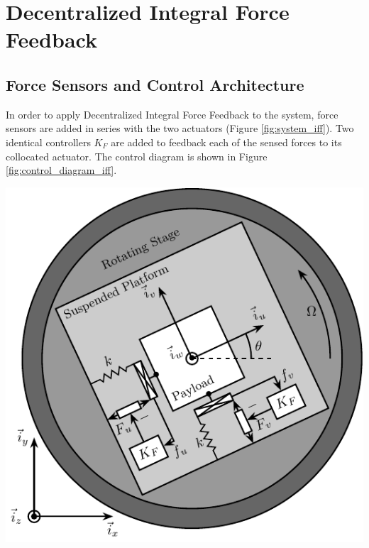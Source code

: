 \documentclass{ISMA_USD2020}
\begin{document}
\section{Decentralized Integral Force Feedback}
\label{sec:org284335d}
\label{sec:iff}
\subsection{Force Sensors and Control Architecture}
\label{sec:org5b8858f}
In order to apply Decentralized Integral Force Feedback to the system, force sensors are added in series with the two actuators (Figure \ref{fig:system_iff}).
Two identical controllers \(K_F\) are added to feedback each of the sensed forces to its collocated actuator.
The control diagram is shown in Figure \ref{fig:control_diagram_iff}.

\begin{minipage}[t]{0.55\linewidth}
\begin{center}
\includegraphics[scale=1]{figs/system_iff.pdf}
\end{center}
\end{minipage}
\hfill
\end{document}
